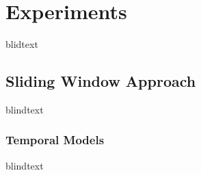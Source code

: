 \chapter{Experiments}
\label{sec:experiments}


blidtext











\section{Sliding Window Approach}
blindtext

\subsection{Temporal Models}
blindtext
